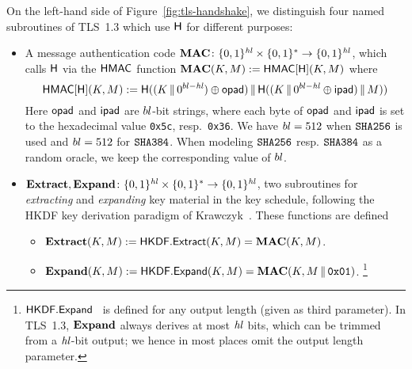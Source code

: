 On the left-hand side of Figure~\ref{fig:tls-handshake}, we distinguish four named subroutines of TLS~1.3 which use $\mathsf{H}$ for different purposes:
\begin{itemize}

	\item A message authentication code $\mathbf{MAC}  \colon \{0,1\}^{\mathit{hl}} \times \{0,1\}^* \to \{0,1\}^{\mathit{hl}}$, which  calls $\mathsf{H}$ via the $\mathsf{HMAC}$ function $\mathbf{MAC}(K, M) := \mathsf{HMAC}[\mathsf{H}](K, M)$ where
\[
\mathsf{HMAC}[\mathsf{H}](K, M) := \mathsf{H}( (K {\,\|\,} 0^{bl - \mathit{hl}}) \oplus \mathsf{opad}) {\,\|\,} \mathsf{H}( (K {\,\|\,} 0^{bl - \mathit{hl}} \oplus \mathsf{ipad}) {\,\|\,} M )) 
\]
Here $\mathsf{opad}$ and $\mathsf{ipad}$ are $bl$-bit strings,
where each byte of $\mathsf{opad}$ and $\mathsf{ipad}$ is set to the hexadecimal value \texttt{0x5c}, resp.\ \texttt{0x36}.
We have $bl=512$ when $\texttt{SHA{256}}$ is used and $bl=512$ for $\texttt{SHA{384}}$. When modeling $\texttt{SHA{256}}$ resp. $\texttt{SHA{384}}$ as a random oracle, we keep the corresponding value of $bl$.


	\item $\mathbf{Extract}, \mathbf{Expand} \colon \{0,1\}^{\mathit{hl}} \times \{0,1\}^* \to \{0,1\}^{\mathit{hl}}$, two subroutines for \emph{extracting} and \emph{expanding} key material in the key schedule, following the HKDF key derivation paradigm of Krawczyk~\cite{C:Krawczyk10,rfc5869}. These functions are defined
\begin{itemize}
	\item $\mathbf{Extract}(K, M) := \mathsf{HKDF.Extract}(K,M) = \mathbf{MAC}(K,M)$.
	
	\item $\mathbf{Expand}(K, M) := \mathsf{HKDF.Expand}(K, M) = \mathbf{MAC}(K, M {\,\|\,} \texttt{0x01})$.%
	\footnote{$\mathsf{HKDF.Expand}$~\cite{rfc5869} is defined for any output length (given as third parameter).
	In TLS~1.3, $\mathbf{Expand}$ always derives at most $\mathit{hl}$ bits, which can be trimmed from a $\mathit{hl}$-bit output; we hence in most places omit the output length parameter.}
\end{itemize} 
\end{itemize}
